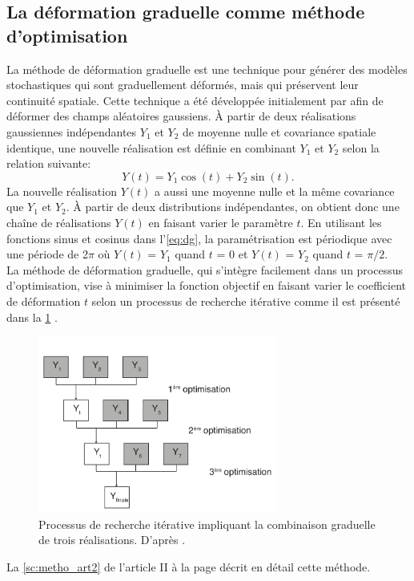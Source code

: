 \subsection{La déformation graduelle comme méthode d'optimisation}
La méthode de déformation graduelle est une technique pour générer des modèles
stochastiques qui sont graduellement déformés, mais qui préservent leur
continuité spatiale. Cette technique a été développée initialement par
\citet{Hu2000} afin de déformer des champs aléatoires gaussiens. À partir de
deux réalisations gaussiennes indépendantes $Y_1$ et $Y_2$ de moyenne nulle et
covariance spatiale identique, une nouvelle réalisation est définie en combinant
$Y_1$ et $Y_2$ selon la relation suivante:
\begin{equation}
Y(t) = Y_1 \cos(t) + Y_2 \sin (t).
\label{eq:dg}
\end{equation}
La nouvelle réalisation $Y(t)$ a aussi une moyenne nulle et la même
covariance que $Y_1$ et $Y_2$. À partir de deux distributions indépendantes, on
obtient donc une chaîne de réalisations $Y(t)$ en faisant varier le paramètre
$t$. En utilisant les fonctions sinus et cosinus dans l'\cref{eq:dg}, la
paramétrisation est périodique avec une période de \num{2}$\pi$ où $Y(t)$ =
$Y_1$ quand $t$ = \num{0} et $Y(t)$ = $Y_2$ quand $t$ =  $\pi/2$. \\
La méthode de déformation graduelle, qui s'intègre facilement dans un processus
d'optimisation, vise à minimiser la fonction objectif en faisant varier le
coefficient de déformation $t$ selon un processus de recherche itérative comme
il est présenté dans la \cref{fig:dg_iter} \citep{LeRavalec2005}.
\begin{figure}[!ht]
\centering
\includegraphics[width=0.7\textwidth]{fig/dg_iter.pdf}
\caption{Processus de recherche itérative impliquant la combinaison graduelle de
trois réalisations. D'après \citet{LeRavalec2005}.}
\label{fig:dg_iter}
\end{figure}
La \cref{sc:metho_art2} de l'article II à la page 
décrit en détail cette méthode.
